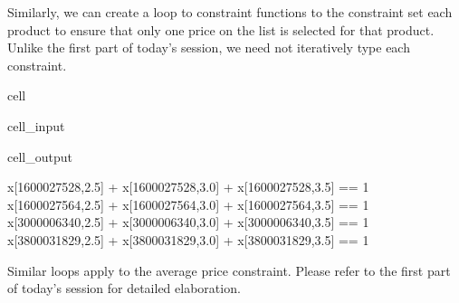 \documentclass[letterpaper,10pt,english]{jupyterBook}
\begin{document}
\sphinxAtStartPar
Similarly, we can create a loop to  constraint functions to the constraint set  each product to ensure that only one price on the list is selected for that product. Unlike the first part of today’s session, we need not iteratively type each constraint.

\begin{sphinxuseclass}{cell}\begin{sphinxVerbatimInput}

\begin{sphinxuseclass}{cell_input}
\begin{sphinxVerbatim}[commandchars=\\\{\}]
   
    \PYG{p}{[}\PYG{p}{]}      
    
\end{sphinxVerbatim}

\end{sphinxuseclass}\end{sphinxVerbatimInput}
\begin{sphinxVerbatimOutput}

\begin{sphinxuseclass}{cell_output}
\begin{sphinxVerbatim}[commandchars=\\\{\}]
x[1600027528,2.5] + x[1600027528,3.0] + x[1600027528,3.5]  ==  1
x[1600027564,2.5] + x[1600027564,3.0] + x[1600027564,3.5]  ==  1
x[3000006340,2.5] + x[3000006340,3.0] + x[3000006340,3.5]  ==  1
x[3800031829,2.5] + x[3800031829,3.0] + x[3800031829,3.5]  ==  1
\end{sphinxVerbatim}

\end{sphinxuseclass}\end{sphinxVerbatimOutput}

\end{sphinxuseclass}
\sphinxAtStartPar
{}

\sphinxAtStartPar
Similar  loops apply to the average price constraint. Please refer to the first part of today’s session for detailed elaboration.
\end{document}
